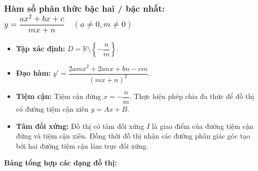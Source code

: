 \documentclass[12pt]{article}
\begin{document}
	\vspace{5mm}
	\subsubsection{Hàm số phân thức bậc hai / bậc nhất: $y = \dfrac{ax^2 + bx + c}{mx + n} \quad (a \neq 0, m \neq 0)$}
	
	\begin{itemize}
		\item \textbf{Tập xác định:} $D = \mathbb{R} \setminus \left\{-\dfrac{n}{m}\right\}$.
		\item \textbf{Đạo hàm:} $y' = \dfrac{2amx^2 + 2anx + bn - cm}{(mx+n)^2}$.
		\item \textbf{Tiệm cận:} Tiệm cận đứng $x = -\dfrac{n}{m}$. Thực hiện phép chia đa thức để đồ thị có đường tiệm cận xiên $y = Ax + B$.
		\item \textbf{Tâm đối xứng:} Đồ thị có tâm đối xứng $I$ là giao điểm của đường tiệm cận đứng và tiệm cận xiên. Đồng thời đồ thị nhận các đường phân giác góc tạo bởi hai đường tiệm cận làm trục đối xứng.
	\end{itemize}
	
	\textbf{Bảng tổng hợp các dạng đồ thị:}
	
\end{document}
